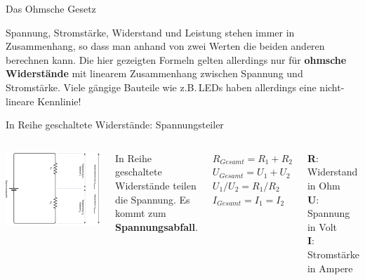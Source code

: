 \begin{frame}{Das Ohmsche Gesetz}
    \bigskip

    \parbox{\linewidth}{
        \footnotesize
        Spannung, Stromstärke, Widerstand und Leistung stehen immer in Zusammenhang,
        so dass man anhand von zwei Werten die beiden anderen berechnen kann.
        Die hier gezeigten Formeln gelten allerdings nur für \textbf{ohmsche Widerstände}
        mit linearem Zusammenhang zwischen Spannung und Stromstärke. Viele gängige Bauteile
        wie z.B.\,LEDs haben allerdings eine nicht-lineare Kennlinie!
    }
\end{frame}

{
\small

\begin{frame}{In Reihe geschaltete Widerstände: Spannungsteiler}
    \begin{columns}
        \includegraphics[width=.85\textwidth]{2-hardwaredesign/img/spannungsteiler}

        In Reihe geschaltete Widerstände teilen die Spannung.
        Es kommt zum \textbf{Spannungsabfall}.

        \bigskip

        $R_{Gesamt} = R_1 + R_2$ \\
        \smallskip
        $U_{Gesamt} = U_1 + U_2$ \\
        \smallskip
        $U_1 / U_2 = R_1 / R_2$ \\
        \smallskip
        $I_{Gesamt} = I_1 = I_2$ \\

        \bigskip

        \textbf{R}: Widerstand in Ohm \\
        \smallskip
        \textbf{U}: Spannung in Volt \\
        \smallskip
        \textbf{I}: Stromstärke in Ampere \\
    \end{columns}


\end{frame}}
